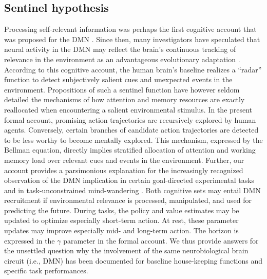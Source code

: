 \documentclass[10pt,letterpaper]{article}
\begin{document}
\subsection{Sentinel hypothesis}
Processing self-relevant information was perhaps the first
cognitive account that was proposed for the DMN \citep{gusnard2001medial}.
Since then,
many investigators have speculated that neural activity in the DMN
may reflect the brain's continuous tracking of
relevance in the environment
as an advantageous evolutionary adaptation \citep{randy2008, hahn2007cingulate}.
According to this cognitive account, the human brain's baseline realizes
a ``radar'' function to
detect subjectively salient cues and unexpected events in the environment.
Propositions of such a sentinel function have however seldom detailed
the mechanisms of
how attention and memory resources are exactly reallocated when
encountering a salient environmental stimulus.
In the present formal account,
promising action trajectories
are recursively explored by human agents. Conversely,
certain branches of candidate action trajectories
are detected to be less worthy to become mentally explored.
This mechanism, expressed by the Bellman equation,
directly implies stratified allocation of attention and working memory load
over relevant cues and events in the environment.
%
Further,
our account provides a parsimonious explanation for
the increasingly recognized observation
of the DMN implication
in certain goal-directed experimental tasks and
in task-unconstrained mind-wandering \citep{smith2009, bzdok2016formal}.
Both cognitive sets may entail DMN recruitment
if environmental relevance is processed, manipulated, and
used for predicting the future.
During tasks,
the policy and value estimates may be
updated to optimize especially short-term action.
At rest, these parameter updates may
improve especially mid- and long-term action.
The horizon is expressed in the $\gamma$ parameter in the formal account.
We thus provide answers for the unsettled question why the involvement
of the same neurobiological brain circuit (i.e., DMN) has been documented
for baseline house-keeping functions and specific task performances.
\end{document}
